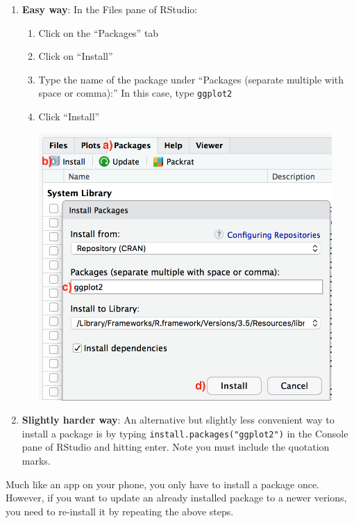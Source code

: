 \documentclass[
  letterpaper,
  DIV=11,
  numbers=noendperiod]{scrreprt}
\theoremstyle{definition}
\theoremstyle{remark}
\begin{document}
\begin{enumerate}
\def\labelenumi{\arabic{enumi}.}
\item
  \textbf{Easy way}: In the Files pane of RStudio:

  \begin{enumerate}
  \def\labelenumii{\alph{enumii})}
  \item
    Click on the ``Packages'' tab
  \item
    Click on ``Install''
  \item
    Type the name of the package under ``Packages (separate multiple
    with space or comma):'' In this case, type \texttt{ggplot2}
  \item
    Click ``Install''

    \includegraphics[width=\textwidth,height=4in]{images/install_packages_easy_way.png}
  \end{enumerate}
\item
  \textbf{Slightly harder way}: An alternative but slightly less
  convenient way to install a package is by typing
  \texttt{install.packages("ggplot2")} in the Console pane of RStudio
  and hitting enter. Note you must include the quotation marks.
\end{enumerate}

Much like an app on your phone, you only have to install a package once.
However, if you want to update an already installed package to a newer
verions, you need to re-install it by repeating the above steps.
\end{document}
